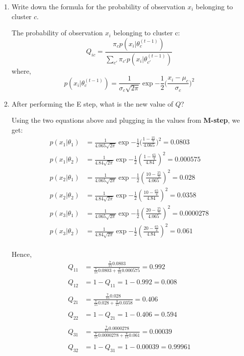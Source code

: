 \documentclass{article}
\begin{document}
\begin{enumerate}[label=(\alph*),resume]
\item Write down the formula for the probability of observation $x_i$ belonging to cluster $c$.
\begin{mdframed}[backgroundcolor=lightgray]
The probability of observation $x_i$ belonging to cluster c:
\begin{equation}
Q_{ic} = \frac{\pi_cp(x_i|\theta_c^{(t-1)})}{\sum_{c'}{\pi_{c'}p(x_i|\theta_{c'}^{(t-1)})}} 
\end{equation}
where,
\begin{equation}
p(x_i|\theta_c^{(t-1)}) = \frac{1}{\sigma_c\sqrt{2\pi}}\exp{-\frac{1}{2}\bigg(\frac{x_i - \mu_c}{\sigma_c}\bigg)^2}
\end{equation}
\end{mdframed}

\item After performing the E step, what is the new value of $Q$?
\begin{mdframed}[backgroundcolor=lightgray]
Using the two equations above and plugging in the values from \textbf{M-step}, we get: 
\begin{align*}
p(x_1|\theta_1) &= \frac{1}{4.065\sqrt{2\pi}}\exp{-\frac{1}{2}\bigg(\frac{1 - \frac{25}{7}}{4.065}\bigg)^2} = 0.0803\\
p(x_1|\theta_2) &= \frac{1}{4.84\sqrt{2\pi}}\exp{-\frac{1}{2}(\frac{1 - \frac{65}{4}}{4.84})^2} = 0.000575\\
p(x_2|\theta_1) &= \frac{1}{4.065\sqrt{2\pi}}\exp{-\frac{1}{2}(\frac{10 - \frac{25}{7}}{4.065})^2} = 0.028\\
p(x_2|\theta_2) &= \frac{1}{4.84\sqrt{2\pi}}\exp{-\frac{1}{2}(\frac{10 - \frac{65}{4}}{4.84})^2} = 0.0358\\
p(x_3|\theta_1) &= \frac{1}{4.065\sqrt{2\pi}}\exp{-\frac{1}{2}(\frac{20 - \frac{25}{7}}{4.065})^2} = 0.0000278\\
p(x_3|\theta_2) &= \frac{1}{4.84\sqrt{2\pi}}\exp{-\frac{1}{2}(\frac{20 - \frac{65}{4}}{4.84})^2} = 0.061\\
\end{align*}

Hence, 
\begin{align*}
Q_{11} &= \frac{\frac{7}{15}0.0803}{\frac{7}{15}0.0803 + \frac{8}{15}0.000575} = 0.992\\\\
Q_{12} &= 1 - Q_{11} = 1 - 0.992  = 0.008\\\\
Q_{21} &= \frac{\frac{7}{15}0.028}{\frac{7}{15}0.028 + \frac{8}{15}0.0358} = 0.406\\\\
Q_{22} &= 1 - Q_{21} = 1 - 0.406  = 0.594\\\\
Q_{31} &= \frac{\frac{7}{15}0.0000278}{\frac{7}{15}0.0000278 + \frac{8}{15}0.061} = 0.00039\\\\
Q_{32} &= 1 - Q_{31} = 1 - 0.00039  = 0.99961
\end{align*}


\end{mdframed}
\end{enumerate}
\end{document}
